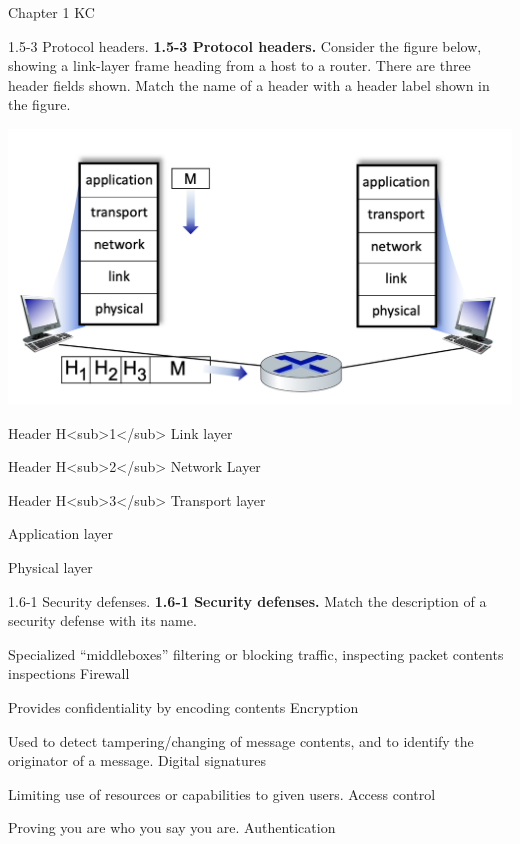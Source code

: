 \documentclass[a4paper]{article}
\begin{document}
\begin{quiz}{Chapter 1 KC}
\begin{matching}[points=1]{1.5-3 Protocol headers.}
\textbf{1.5-3 Protocol headers.}
Consider the figure below, showing a link-layer frame heading from a host to a router. There are three header fields shown. Match the name of a header with a header label shown in the figure. 
\begin{center}
\includegraphics[width=\linewidth]{figs/1.5.3.jpg}
\end{center}

\item Header H<sub>1</sub> \answer Link layer
\item Header H<sub>2</sub> \answer Network Layer
\item Header H<sub>3</sub> \answer Transport layer
\item \answer Application layer
\item \answer Physical layer
\end{matching}

\begin{matching}[points=1]{1.6-1 Security defenses.}
\textbf{1.6-1 Security defenses.}
Match the description of a security defense with its name.

\item Specialized ``middleboxes'' filtering or blocking traffic, inspecting packet contents inspections \answer Firewall
\item Provides confidentiality by encoding contents \answer Encryption
\item Used to detect tampering/changing of message contents, and to identify the originator of a message. \answer Digital signatures
\item Limiting use of resources or capabilities to given users. \answer Access control
\item Proving you are who you say you are. \answer Authentication
\end{matching}


\end{quiz}
\end{document}
